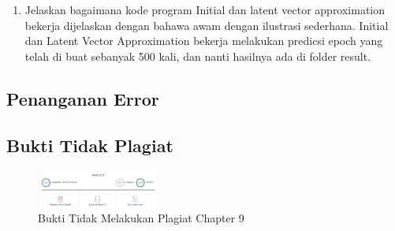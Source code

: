 \begin{enumerate}
		

        	\item Jelaskan bagaimana kode program Initial dan latent vector approximation bekerja dijelaskan dengan bahawa awam dengan ilustrasi sederhana.
Initial dan Latent Vector Approximation bekerja melakukan predicsi epoch yang telah di buat sebanyak 500 kali, dan nanti hasilnya ada di folder result.

		


\end{enumerate}

\subsection{Penanganan Error}

\subsection{Bukti Tidak Plagiat}
\begin{figure}[H]
\centering
	\includegraphics[width=4cm]{figures/1174003/9/cekplagiarisme.PNG}
	\caption{Bukti Tidak Melakukan Plagiat Chapter 9}
\end{figure}